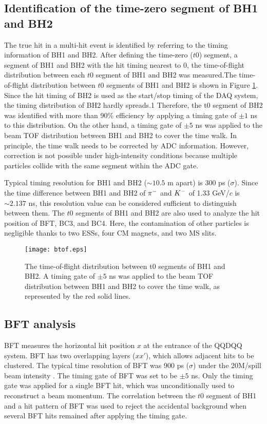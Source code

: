 \subsection{Identification of the time-zero segment of BH1 and BH2}
The true hit in a multi-hit event is identified by referring to the timing information of BH1 and BH2. After defining the time-zero ($t0$) segment, a segment of BH1 and BH2 with the hit timing nearest to 0, the time-of-flight distribution between each $t0$ segment of BH1 and BH2 was measured.The time-of-flight distribution between $t0$ segments of BH1 and BH2 is shown in Figure \ref{fig-btof}. Since the hit timing of BH2 is used as the start/stop timing of the DAQ system, the timing distribution of BH2 hardly spreads.1
Therefore, the t0 segment of BH2 was identified with more than 90\% efficiency by applying a timing gate of $\pm1$ ns to this distribution. On the other hand, a timing gate of $\pm5$ ns was applied to the beam TOF distribution between BH1 and BH2 to cover the time walk. In principle, the time walk needs to be corrected by ADC information. However, correction is not possible under high-intensity conditions because multiple particles collide with the same segment within the ADC gate.

Typical timing resolution for BH1 and BH2 ($\sim10.5$ m apart) is 300 ps ($\sigma$). Since the time difference between BH1 and BH2 of $\pi^{-}$ and $K^{-}$ of 1.33 GeV/$c$ is $\sim2.137$ ns, this resolution value can be considered sufficient to distinguish between them. The $t0$ segments of BH1 and BH2 are also used to analyze the hit position of BFT, BC3, and BC4. Here, the contamination of other particles is negligible thanks to two ESSs, four CM magnets, and two MS slits. 

\begin{figure}[!h]
  \begin{center}
    \texttt{[image: btof.eps]}
    \caption{The time-of-flight distribution between t0 segments of BH1 and BH2. A timing gate of $\pm5$ ns was applied to the beam TOF distribution between BH1 and BH2 to cover the time walk, as represented by the red solid lines.}
    \label{fig-btof}
  \end{center}
\end{figure}

\subsection{BFT analysis}
BFT measures the horizontal hit position $x$ at the entrance of the QQDQQ system. BFT has two overlapping layers ($xx'$), which allows adjacent hits to be clustered. The typical time resolution of BFT was 900 ps ($\sigma$) under the 20M/spill beam intensity \cite{Nana-D}. The timing gate of BFT was set to be $\pm5$ ns. Only the timing gate was applied for a single BFT hit, which was unconditionally used to reconstruct a beam momentum. The correlation between the $t0$ segment of BH1 and a hit pattern of BFT was used to reject the accidental background when several BFT hits remained after applying the timing gate.

